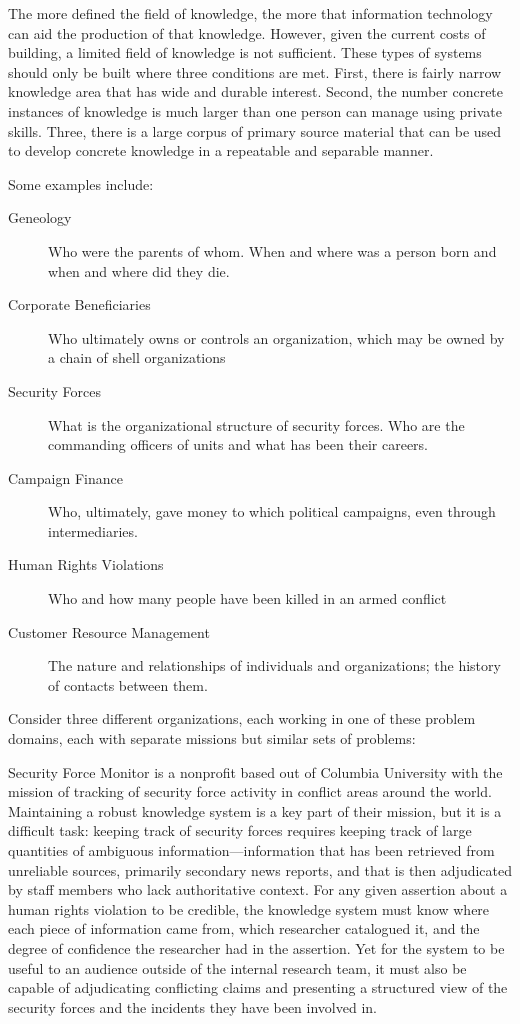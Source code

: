 \documentclass[format=siggraph, review=true]{acmart}
\begin{document}
The more defined the field of knowledge, the more that information
technology can aid the production of that knowledge. However, given
the current costs of building, a limited field of knowledge is not
sufficient. These types of systems should only be built where three
conditions are met. First, there is fairly narrow knowledge area that
has wide and durable interest. Second, the number concrete instances
of knowledge is much larger than one person can manage using private
skills. Three, there is a large corpus of primary source material that
can be used to develop concrete knowledge in a repeatable and
separable manner.

Some examples include:

\begin{description}
  \item [Geneology] Who were the parents of whom. When and where was a person
    born and when and where did they die.
  \item [Corporate Beneficiaries] Who ultimately owns or controls an
    organization, which may be owned by a chain of shell organizations
  \item [Security Forces] What is the organizational structure of
    security forces. Who are the commanding officers of units and
    what has been their careers.
  \item [Campaign Finance] Who, ultimately, gave money to which
    political campaigns, even through intermediaries.
  \item [Human Rights Violations] Who and how many people have been
    killed in an armed conflict
  \item [Customer Resource Management] The nature and relationships of individuals and organizations; the history of contacts between them. 
\end{description}

Consider three different organizations, each working in one of these problem
domains, each with separate missions but similar sets of problems:

Security Force Monitor is a nonprofit based out of Columbia University
with the mission of tracking of security force activity in conflict areas
around the world. Maintaining a robust knowledge system is a key part of
their mission, but it is a difficult task: keeping track of security forces
requires keeping track of large quantities of ambiguous
information—information that has been retrieved from unreliable sources,
primarily secondary news reports, and that is then adjudicated by staff
members who lack authoritative context. For any given assertion about a
human rights violation to be credible, the knowledge system must know
where each piece of information came from, which researcher catalogued it,
and the degree of confidence the researcher had in the assertion. Yet for
the system to be useful to an audience outside of the internal research
team, it must also be capable of adjudicating conflicting claims and
presenting a structured view of the security forces and the incidents
they have been involved in.
\end{document}
